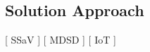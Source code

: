 \subsection{Solution Approach}
[ SSaV ] [ MDSD ] [ IoT ] 
\newline
[ Casper ] [ Phu ] [ Simon ]
\newline

\begin{comment}
The Smart door design is split into the hardware actuators and sensors, and the sofware that connects and gives logic and connects them together. For the hardware to work it must have a software that supports it for our requirements for the system to work. 

The hardware design is split up into 3 components, buttons, Bluetooth and LED.  First for the basic functionality, such as unlocking and locking using the buttons and other potential component such as potenti-o-meter. Second being bluetooth, here several protocols exists. There is SPP which allows for sending commands, but it has been deprecated1. There is GATT2 which allows for 1-1 communications and stops advertising as soon as it has a connection. It requires BLE which some older phones may not be able to run. There is BLE itself which is a more modern version of bluetooth and better in most regards, especilally when it comes to power consumption3. But is not backward compatible with classic, which will lower potential users. Bluetooth classic which often used for music transfer3 has the advantage of being older and thereby more devices run it. While having the features required the group chose this, while the drawback being increased power consumption, having more potential customers is more valued. And lastly the LED to show shift in colors to show the current state is changed for the statemachince.
For the Software part, chosing the correct coding language to implement the smart door corresponds with in requirement of the previous section aswell coding the Statemachine, The ESP is mainly writtin in C, though it has API’s that can integrete with others aswell as some support for C alternative, C++, C is the most viable, being a low level memeory allocating code, giving the system the better potential to optimise code to validate our needs for the system \cite{Grothotkov_2022:ESP_c++}\cite{codedamn:news_2023}. 

To create design for the Statemachine, UPPAAL is a software used to show the different states and varify the system validation. It uses Nodes and edges to determine which relations each states can traverse to other states using conecepts like gaurds and invariance to introduce logical components for statemachine is working as intended \cite{UPPAAL:UPPAAL}. 


1 https://www.bluetooth.com/specifications/specs/serial-port-profile-1-1/\\
2 https://learn.adafruit.com/introduction-to-bluetooth-low-energy/gatt\\
3 https://www.bluetooth.com/learn-about-bluetooth/tech-overview/\\
\end{comment}
